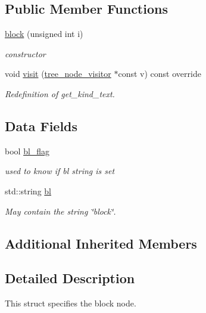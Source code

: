 \subsection*{Public Member Functions}
\begin{DoxyCompactItemize}
\item 
\hyperlink{structblock_ae28c301a1664fe41e9755c141b697d62}{block} (unsigned int i)
\begin{DoxyCompactList}\small\item\em constructor \end{DoxyCompactList}\item 
void \hyperlink{structblock_a637ca9811cf1cf93dd10c10cb174b9c4}{visit} (\hyperlink{classtree__node__visitor}{tree\+\_\+node\+\_\+visitor} $\ast$const v) const override
\begin{DoxyCompactList}\small\item\em Redefinition of get\+\_\+kind\+\_\+text. \end{DoxyCompactList}\end{DoxyCompactItemize}
\subsection*{Data Fields}
\begin{DoxyCompactItemize}
\item 
bool \hyperlink{structblock_ac86db00633ff0df8ce2cb9ac8a757310}{bl\+\_\+flag}
\begin{DoxyCompactList}\small\item\em used to know if bl string is set \end{DoxyCompactList}\item 
std\+::string \hyperlink{structblock_a42349bc8e59e65ef46f60ef9c63c2109}{bl}
\begin{DoxyCompactList}\small\item\em May contain the string \char`\"{}block\char`\"{}. \end{DoxyCompactList}\end{DoxyCompactItemize}
\subsection*{Additional Inherited Members}


\subsection{Detailed Description}
This struct specifies the block node. 

